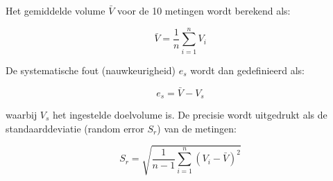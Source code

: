 Het gemiddelde volume $\bar{V}$ voor de 10 metingen wordt berekend als:

\begin{equation} \bar{V} = \frac{1}{n} \sum_{i=1}^{n} V_i \end{equation}

De systematische fout (nauwkeurigheid) $e_s$ wordt dan gedefinieerd als:

\begin{equation} e_s = \bar{V} - V_s \end{equation}

waarbij $V_s$ het ingestelde doelvolume is. De precisie wordt uitgedrukt als de standaarddeviatie (random error $S_r$) van de metingen:

\begin{equation} S_r = \sqrt{ \frac{1}{n-1} \sum_{i=1}^{n} {(V_i - \bar{V})}^2 } \end{equation}